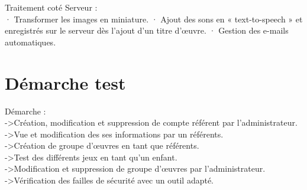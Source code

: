 \documentclass[12pt,a4paper]{report}
\begin{document}
Traitement coté Serveur :\\
·         Transformer les images en miniature.
·         Ajout des sons en « text-to-speech » et enregistrés sur le serveur dès l’ajout d’un titre d’œuvre.
·         Gestion des e-mails automatiques.

\chapter{Démarche test}
Démarche : \\
->Création, modification et suppression de compte référent par l'administrateur.\\
->Vue et modification des ses informations par un référents.\\
->Création de groupe d'œuvres en tant que référents. \\
->Test des différents jeux en tant qu’un enfant.\\
->Modification et suppression de groupe d'œuvres par l'administrateur.\\
->Vérification des failles de sécurité avec un outil adapté.
\end{document}
